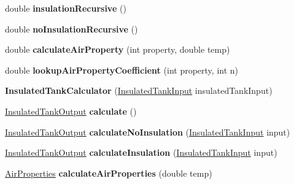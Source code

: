 \begin{DoxyCompactItemize}
double {\bfseries insulation\+Recursive} ()
\item 
\mbox{\label{class_insulated_tank_calculator_a5b470dbc6c206cce9c997be281997f20}} 
double {\bfseries no\+Insulation\+Recursive} ()
\item 
\mbox{\label{class_insulated_tank_calculator_a2f7dfc0f35c887849f778e7e342efe48}} 
double {\bfseries calculate\+Air\+Property} (int property, double temp)
\item 
\mbox{\label{class_insulated_tank_calculator_af91fb268ec43e8cb3ccdbce40f45b46c}} 
double {\bfseries lookup\+Air\+Property\+Coefficient} (int property, int n)
\item 
\mbox{\label{class_insulated_tank_calculator_a2179048bd97f926178964043c3249ae6}} 
{\bfseries Insulated\+Tank\+Calculator} (\hyperlink{class_insulated_tank_input}{Insulated\+Tank\+Input} insulated\+Tank\+Input)
\item 
\mbox{\label{class_insulated_tank_calculator_a028195292f18e48216475db52a0f4651}} 
\hyperlink{class_insulated_tank_output}{Insulated\+Tank\+Output} {\bfseries calculate} ()
\item 
\mbox{\label{class_insulated_tank_calculator_af1b61338df8facee94cdd2c88d160eee}} 
\hyperlink{class_insulated_tank_output}{Insulated\+Tank\+Output} {\bfseries calculate\+No\+Insulation} (\hyperlink{class_insulated_tank_input}{Insulated\+Tank\+Input} input)
\item 
\mbox{\label{class_insulated_tank_calculator_a9dede09f397b135d15451c06e20596a9}} 
\hyperlink{class_insulated_tank_output}{Insulated\+Tank\+Output} {\bfseries calculate\+Insulation} (\hyperlink{class_insulated_tank_input}{Insulated\+Tank\+Input} input)
\item 
\mbox{\label{class_insulated_tank_calculator_af65eb305cc12e7e1c539e160f60837bd}} 
\hyperlink{class_air_properties}{Air\+Properties} {\bfseries calculate\+Air\+Properties} (double temp)
\item 

\end{DoxyCompactItemize}

